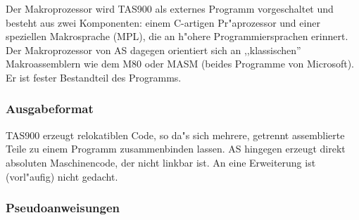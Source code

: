 \documentclass[12pt,a4paper,twoside]{report}
\begin{document}
Der Makroprozessor wird TAS900 als externes Programm vorgeschaltet und
besteht aus zwei Komponenten: einem C-artigen Pr"aprozessor und einer
speziellen Makrosprache (MPL), die an h"ohere Programmiersprachen
erinnert.  Der Makroprozessor von AS dagegen orientiert sich an
,,klassischen'' Makroassemblern wie dem M80 oder MASM (beides Programme
von Microsoft).  Er ist fester Bestandteil des Programms.

\subsubsection{Ausgabeformat}

TAS900 erzeugt relokatiblen Code, so da"s sich mehrere, getrennt assemblierte
Teile zu einem Programm zusammenbinden lassen.  AS hingegen erzeugt direkt
absoluten Maschinencode, der nicht linkbar ist.  An eine Erweiterung ist
(vorl"aufig) nicht gedacht.

\subsubsection{Pseudoanweisungen}
\end{document}
